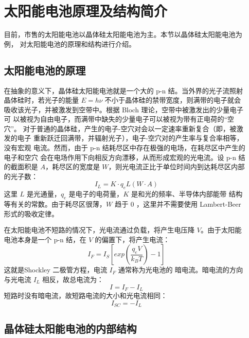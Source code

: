 \section{太阳能电池原理及结构简介}

目前，市售的太阳能电池以晶体硅太阳能电池为主。本节以晶体硅太阳能电池为例，
对太阳能电池的原理和结构进行介绍。

\subsection{太阳能电池的原理}

在抽象的意义下，晶体硅太阳能电池就是一个大的 p-n 结。当外界的光子流照射
晶体硅时，若光子的能量 $E = h\nu$ 不小于晶体硅的禁带宽度，则满带的电子就会
吸收该光子，并被激发到空带中。根据 Bloch 理论，空带中被激发出的少量电子可
以被视为自由电子，而满带中缺失的少量电子可以被视为带有正电荷的“空穴”。
对于普通的晶体硅，产生的电子-空穴对会以一定速率重新复合（即，被激发的电子
重新跃迁回满带，并辐射光子），电子-空穴对的产生率与复合率相等，没有宏观
电流。然而，由于 p-n 结耗尽区中存在极强的电场，在耗尽区中产生的电子和空穴
会在电场作用下向相反方向漂移，从而形成宏观的光电流。设 p-n 结的截面积是
$A$，耗尽区的宽度是 $W$，则光电流正比于单位时间内到达耗尽区内部的光子数：
\begin{equation} \label{eqn:LightCurrent}
I_L = K \cdot q_e L(W \cdot A)
\end{equation}
这里 $L$ 是光通量，$q_e$ 是电子的电荷量，$K$ 是和光的频率、半导体内部能带
结构等有关的常数。由于耗尽区很薄，$W$ 趋于 $0$ ，这里并不需要使用
Lambert-Beer 形式的吸收定律。

在太阳能电池不短路的情况下，光电流通过负载，将产生电压降 $V$。由于太阳能
电池本身是一个 p-n 结，在 $V$ 的偏置下，将产生电流：
\begin{equation} \label{eqn:Shockley}
I_F = I_S \left[ exp \left(\frac{q_e V}{k_B T} \right) - 1 \right]
\end{equation}
这就是Shockley 二极管方程，电流 $I_F$ 通常称为光电池的
暗电流。暗电流的方向与光电流 $I_L$ 相反，故总电流为：
\begin{equation} \label{eqn:TotalCurrent}
I = I_F - I_L
\end{equation}
短路时没有暗电流，故短路电流的大小和光电流相同：
\begin{equation} \label{eqn:SCCurrent}
I_{SC} = -I_L
\end{equation}

\subsection{晶体硅太阳能电池的内部结构}

